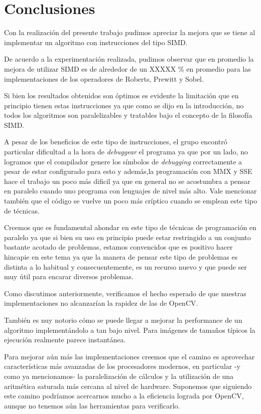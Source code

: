 \section{Conclusiones}

Con la realización del presente trabajo pudimos apreciar la mejora que se tiene al implementar un algoritmo con instrucciones del tipo SIMD.

De acuerdo a la experimentación realizada, pudimos observar que en promedio la mejora de utilizar SIMD es de alrededor de un XXXXX \% en promedio para las implementaciones de los operadores de Roberts, Prewitt y Sobel.

Si bien los resultados obtenidos son óptimos es evidente la limitación que en principio tienen estas instrucciones ya que como se dijo en la introducción, no todos los algoritmos son paralelizables y tratables bajo el concepto de la filosofía SIMD.

A pesar de los beneficios de este tipo de instrucciones, el grupo encontró particular dificultad a la hora de \emph{debuggear} el programa ya que por un lado, no logramos que el compilador genere los símbolos de \emph{debugging} correctamente a pesar de estar configurado para esto y además,la programación con MMX y SSE hace el trabajo un poco más dificil ya que en general no se acostumbra a pensar en paralelo cuando uno programa con lenguajes de nivel más alto. Vale mencionar también que el código se vuelve un poco más críptico cuando se emplean este tipo de técnicas.

Creemos que es fundamental ahondar en este tipo de técnicas de programación en paralelo ya que si bien su uso en principio puede estar restringido a un conjunto bastante acotado de problemas, estamos convencidos que es positivo hacer hincapie en este tema ya que la manera de pensar este tipo de problemas es distinta a lo habitual y consecuentemente, es un recurso nuevo y que puede ser muy útil para encarar diversos problemas.



Como discutimos anteriormente, verificamos el hecho esperado de que nuestras implementaciones no alcanzarían la rapidez de las de OpenCV.

También es nuy notorio cómo se puede llegar a mejorar la performance de un algoritmo implementándolo a tan bajo nivel. Para imágenes de tamaños típicos la ejecución realmente parece instantánea.

Para mejorar aún más las implementaciones creemos que el camino es aprovechar características más avanzadas de los procesadores modernos, en particular -y como ya mencionamos- la paralelización de cálculos y la utilización de una aritmética saturada más cercana al nivel de hardware. Suponemos que siguiendo este camino podríamos acercarnos mucho a la eficiencia lograda por OpenCV, aunque no tenemos aún las herramientas para verificarlo.
